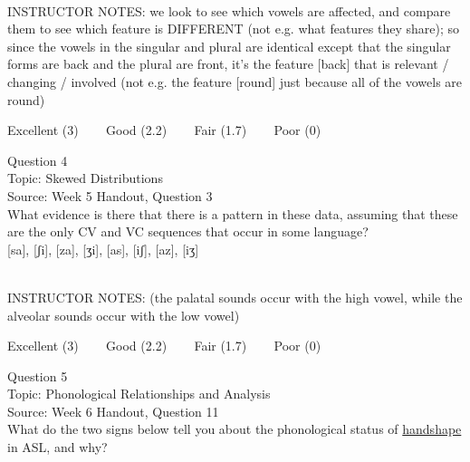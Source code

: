 \documentclass[12pt]{article}
\begin{document}
~\\
INSTRUCTOR NOTES: we look to see which vowels are affected, and compare them to see which feature is DIFFERENT (not e.g. what features they share); so since the vowels in the singular and plural are identical except that the singular forms are back and the plural are front, it's the feature [back] that is relevant / changing / involved (not e.g. the feature [round] just because all of the vowels are round)


\vfill
Excellent (3) ~~~ Good (2.2) ~~~ Fair (1.7) ~~~ Poor (0)
\newpage

{\large Question 4}\\

Topic: Skewed Distributions\\
Source: Week 5 Handout, Question 3\\

What evidence is there that there is a pattern in these data, assuming that these are the only CV and VC sequences that occur in some language?\\

{[sa]}, {[ʃi]}, {[za]}, {[ʒi]}, {[as]}, {[iʃ]}, {[az]}, {[iʒ]}


~\\
INSTRUCTOR NOTES: (the palatal sounds occur with the high vowel, while the alveolar sounds occur with the low vowel)


\vfill
Excellent (3) ~~~ Good (2.2) ~~~ Fair (1.7) ~~~ Poor (0)
\newpage

{\large Question 5}\\

Topic: Phonological Relationships and Analysis\\
Source: Week 6 Handout, Question 11\\

What do the two signs below tell you about the phonological status of \underline{handshape} in ASL, and why?\\
\end{document}
